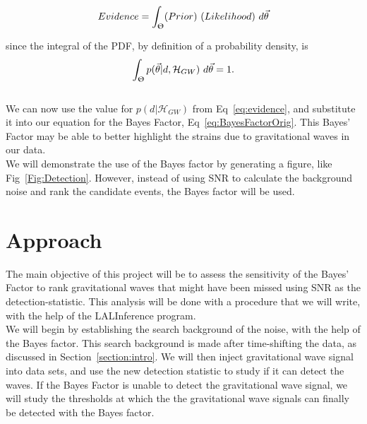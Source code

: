 \documentclass{article}
\begin{document}
\begin{equation} \label{eq:evidenceEnglish}
	Evidence    = \int_{\Uptheta} (Prior) \ (Likelihood) \ d\vec{\theta}
\end{equation}


since the integral of the PDF, by definition of a probability density, is $$\int_{\Uptheta} p(\vec{\theta}|d, \mathcal{H}_{GW})\ d\vec{\theta}  = 1 .$$ \\

We can now use the value for $p(d|\mathcal{H}_{GW})$ from  Eq~\ref{eq:evidence}, and substitute it into our equation for the Bayes Factor, Eq~\ref{eq:BayesFactorOrig}. This Bayes' Factor may be able to better highlight the strains due to gravitational waves in our data.\\

We will demonstrate the use of the Bayes factor by generating a figure, like Fig~\ref{Fig:Detection}. However, instead of using SNR to calculate the background noise and rank the candidate events, the Bayes factor will be used. %

\newpage
 
 
 \section{Approach}
 The main objective of this project will be to assess the sensitivity of the Bayes' Factor to rank gravitational waves that might have been missed using SNR as the detection-statistic. This analysis will be done with a procedure that we will write, with the help of the LALInference program.\\
 
 We will begin by establishing the search background of the noise, with the help of the Bayes factor. This search background is made after time-shifting the data, as discussed in Section~\ref{section:intro}.  We will then inject gravitational wave signal into data sets, and use the new detection statistic to study if it can detect the waves. If the Bayes Factor is unable to detect the gravitational wave signal, we will study the thresholds at which the the gravitational wave signals can finally be detected with the Bayes factor. \\
 
\end{document}
